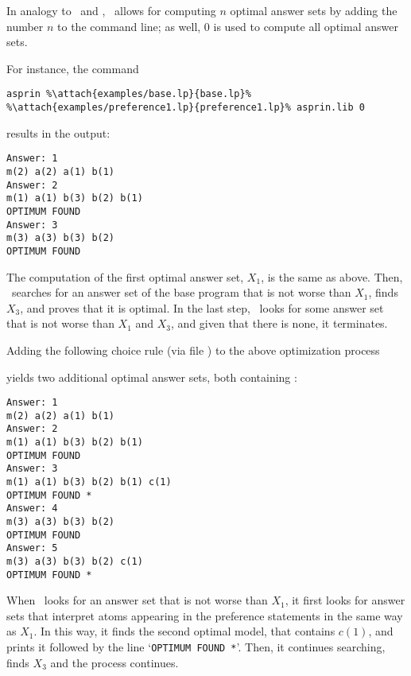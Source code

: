 In analogy to \clasp\ and \clingo, 
\asprin\ allows for computing $n$ optimal answer sets by adding the number $n$ to the command line;
as well, $0$ is used to compute all optimal answer sets. 

\begin{example}
For instance, the command
%
\begin{lstlisting}[numbers=none,escapechar=\%]
asprin %\attach{examples/base.lp}{base.lp}% %\attach{examples/preference1.lp}{preference1.lp}% asprin.lib 0
\end{lstlisting}
%
results in the output:
%
\begin{lstlisting}[numbers=none]
Answer: 1
m(2) a(2) a(1) b(1)
Answer: 2
m(1) a(1) b(3) b(2) b(1)
OPTIMUM FOUND
Answer: 3
m(3) a(3) b(3) b(2)
OPTIMUM FOUND
\end{lstlisting}
%
The computation of the first optimal answer set, $X_1$, is the same as above.
Then, \asprin\ searches for an answer set of the base program that is not worse than $X_1$, 
finds $X_3$, and proves that it is optimal. 
In the last step, \asprin\ looks for some answer set that is not worse than $X_1$ and $X_3$,  
and given that there is none, it terminates. 

Adding the following choice rule 
(via file )
to the above optimization process
%

%
yields two additional optimal answer sets, both containing : 
%
%
\begin{lstlisting}[numbers=none]
Answer: 1
m(2) a(2) a(1) b(1)
Answer: 2
m(1) a(1) b(3) b(2) b(1)
OPTIMUM FOUND
Answer: 3
m(1) a(1) b(3) b(2) b(1) c(1)
OPTIMUM FOUND *
Answer: 4
m(3) a(3) b(3) b(2)
OPTIMUM FOUND
Answer: 5
m(3) a(3) b(3) b(2) c(1)
OPTIMUM FOUND *
\end{lstlisting}
%
When \asprin\ looks for an answer set that is not worse than $X_1$,  
it first looks for answer sets that interpret atoms appearing in the preference statements
in the same way as $X_1$. 
In this way,
it finds the second optimal model, that contains $c(1)$, 
and prints it followed by the line `\lstinline{OPTIMUM FOUND *}'.  
Then, it continues searching, finds $X_3$ and the process continues. 


\end{example}
